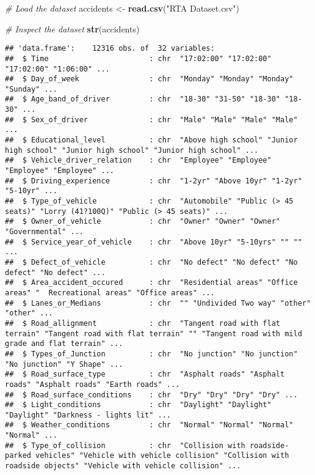 \documentclass[
]{article}
\newenvironment{Shaded}{\begin{snugshade}}{\end{snugshade}}
\newcommand{\CommentTok}[1]{\textcolor[rgb]{0.56,0.35,0.01}{\textit{#1}}}
\newcommand{\FunctionTok}[1]{\textcolor[rgb]{0.13,0.29,0.53}{\textbf{#1}}}
\newcommand{\NormalTok}[1]{#1}
\newcommand{\OtherTok}[1]{\textcolor[rgb]{0.56,0.35,0.01}{#1}}
\newcommand{\StringTok}[1]{\textcolor[rgb]{0.31,0.60,0.02}{#1}}
\begin{document}
\begin{Shaded}
\begin{Highlighting}[]
\CommentTok{\# Load the dataset}
\NormalTok{accidents }\OtherTok{\textless{}{-}} \FunctionTok{read.csv}\NormalTok{(}\StringTok{"RTA Dataset.csv"}\NormalTok{)}

\CommentTok{\# Inspect the dataset}
\FunctionTok{str}\NormalTok{(accidents)}
\end{Highlighting}
\end{Shaded}

\begin{verbatim}
## 'data.frame':    12316 obs. of  32 variables:
##  $ Time                       : chr  "17:02:00" "17:02:00" "17:02:00" "1:06:00" ...
##  $ Day_of_week                : chr  "Monday" "Monday" "Monday" "Sunday" ...
##  $ Age_band_of_driver         : chr  "18-30" "31-50" "18-30" "18-30" ...
##  $ Sex_of_driver              : chr  "Male" "Male" "Male" "Male" ...
##  $ Educational_level          : chr  "Above high school" "Junior high school" "Junior high school" "Junior high school" ...
##  $ Vehicle_driver_relation    : chr  "Employee" "Employee" "Employee" "Employee" ...
##  $ Driving_experience         : chr  "1-2yr" "Above 10yr" "1-2yr" "5-10yr" ...
##  $ Type_of_vehicle            : chr  "Automobile" "Public (> 45 seats)" "Lorry (41?100Q)" "Public (> 45 seats)" ...
##  $ Owner_of_vehicle           : chr  "Owner" "Owner" "Owner" "Governmental" ...
##  $ Service_year_of_vehicle    : chr  "Above 10yr" "5-10yrs" "" "" ...
##  $ Defect_of_vehicle          : chr  "No defect" "No defect" "No defect" "No defect" ...
##  $ Area_accident_occured      : chr  "Residential areas" "Office areas" "  Recreational areas" "Office areas" ...
##  $ Lanes_or_Medians           : chr  "" "Undivided Two way" "other" "other" ...
##  $ Road_allignment            : chr  "Tangent road with flat terrain" "Tangent road with flat terrain" "" "Tangent road with mild grade and flat terrain" ...
##  $ Types_of_Junction          : chr  "No junction" "No junction" "No junction" "Y Shape" ...
##  $ Road_surface_type          : chr  "Asphalt roads" "Asphalt roads" "Asphalt roads" "Earth roads" ...
##  $ Road_surface_conditions    : chr  "Dry" "Dry" "Dry" "Dry" ...
##  $ Light_conditions           : chr  "Daylight" "Daylight" "Daylight" "Darkness - lights lit" ...
##  $ Weather_conditions         : chr  "Normal" "Normal" "Normal" "Normal" ...
##  $ Type_of_collision          : chr  "Collision with roadside-parked vehicles" "Vehicle with vehicle collision" "Collision with roadside objects" "Vehicle with vehicle collision" ...

\end{verbatim}
\end{document}
